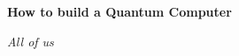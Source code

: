 \documentclass[12pt]{article}
\begin{document}
\begin{center}
    \Huge \textbf{How to build a Quantum Computer}
\end{center}

\begin{center}
    \emph{\large All of us}
\end{center}



\newpage

\newpage

\newpage
%
\newpage

\newpage


\printbibliography

\newpage


% 
% 
% 
% 
% 
\end{document}
